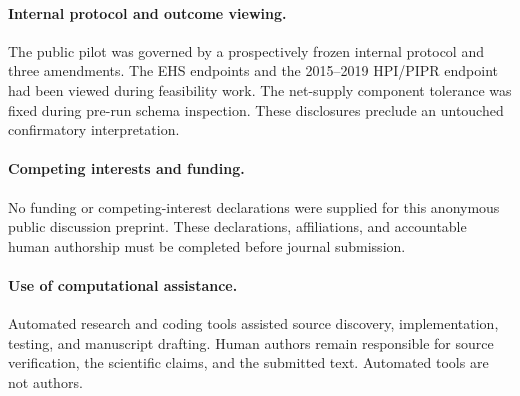 \documentclass[11pt]{article}
\begin{document}
\paragraph{Internal protocol and outcome viewing.}
The public pilot was governed by a prospectively frozen internal protocol and
three amendments. The EHS
endpoints and the 2015--2019 HPI/PIPR endpoint had been viewed during feasibility
work. The net-supply component tolerance was fixed during pre-run schema
inspection. These disclosures preclude an untouched confirmatory interpretation.

\paragraph{Competing interests and funding.}
No funding or competing-interest declarations were supplied for this anonymous
public discussion preprint. These declarations, affiliations, and accountable
human authorship must be completed before journal submission.

\paragraph{Use of computational assistance.}
Automated research and coding tools assisted source discovery, implementation,
testing, and manuscript drafting. Human authors remain responsible for source
verification, the scientific claims, and the submitted text. Automated tools are
not authors.

\appendix




\end{document}
